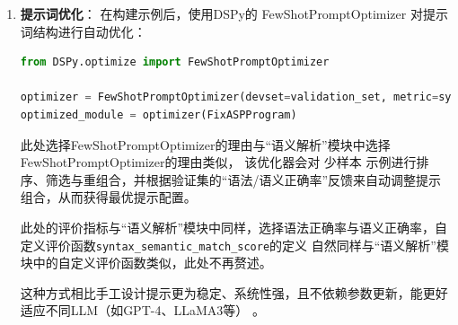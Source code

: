 \begin{enumerate}[nosep]
\begin{lstlisting}[language=python]
examples = [
    Example(
        inputs={
            "error_code": "node(a). node(b) edge(a,b). path(X,Y) :- edge(X,Y). path(X,Z) :- edge(X,Y), path(Y,Z).",
            "error_description": "Missing period at the end of rule.",
            "error_type": "<stdin>:3:1: error: syntax error, unexpected IDENTIFIER, expecting '.' or ':node(b)"
        },
        outputs={
            "corrected_code": "node(a). node(b) edge(a,b). path(X,Y) :- edge(X,Y). path(X,Z) :- edge(X,Y), path(Y,Z)."
        }
    ),
    ...
]
\end{lstlisting}
\item \textbf{提示词优化}：
在构建示例后，使用DSPy的 FewShotPromptOptimizer 对提示词结构进行自动优化：
\begin{lstlisting}[language=python]
from DSPy.optimize import FewShotPromptOptimizer

optimizer = FewShotPromptOptimizer(devset=validation_set, metric=syntax_semantic_match_score)
optimized_module = optimizer(FixASPProgram)
\end{lstlisting}
此处选择FewShotPromptOptimizer的理由与“语义解析”模块中选择FewShotPromptOptimizer的理由类似，
该优化器会对 少样本 示例进行排序、筛选与重组合，并根据验证集的“语法/语义正确率”反馈来自动调整提示组合，从而获得最优提示配置。

此处的评价指标与“语义解析”模块中同样，选择语法正确率与语义正确率，自定义评价函数\texttt{syntax\_semantic\_match\_score}的定义
自然同样与“语义解析”模块中的自定义评价函数类似，此处不再赘述。

这种方式相比手工设计提示更为稳定、系统性强，且不依赖参数更新，能更好适应不同LLM（如GPT-4、LLaMA3等） 。
\end{enumerate}
